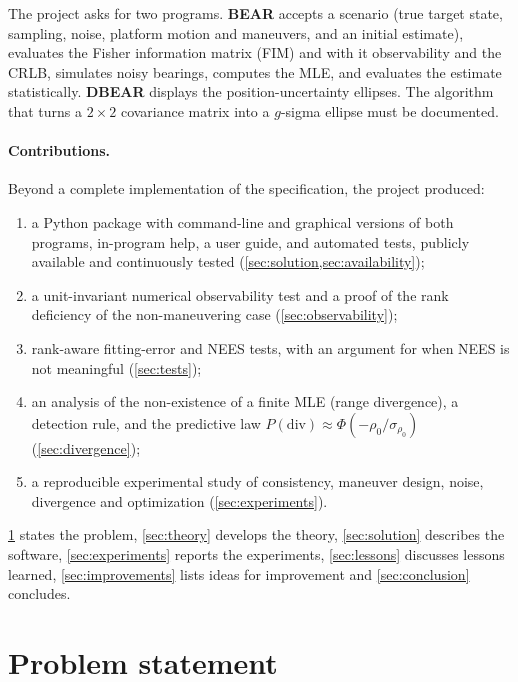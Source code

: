 \documentclass[11pt,a4paper]{article}
\theoremstyle{plain}
\theoremstyle{remark}
\begin{document}
The project asks for two programs. \textbf{BEAR} accepts a scenario (true
target state, sampling, noise, platform motion and maneuvers, and an initial
estimate), evaluates the Fisher information matrix (FIM) and with it
observability and the CRLB, simulates noisy bearings, computes the MLE, and
evaluates the estimate statistically. \textbf{DBEAR} displays the
position-uncertainty ellipses. The algorithm that turns a $2\times2$
covariance matrix into a $g$-sigma ellipse must be documented.

\paragraph{Contributions.} Beyond a complete implementation of the
specification, the project produced:
\begin{enumerate}[nosep]
  \item a Python package with command-line and graphical versions of both
        programs, in-program help, a user guide, and \testsTotal{} automated
        tests, publicly available and continuously tested
        (\cref{sec:solution,sec:availability});
  \item a unit-invariant numerical observability test and a proof of the
        rank deficiency of the non-maneuvering case (\cref{sec:observability});
  \item rank-aware fitting-error and NEES tests, with an argument for when
        NEES is not meaningful (\cref{sec:tests});
  \item an analysis of the non-existence of a finite MLE (range divergence),
        a detection rule, and the predictive law
        $P(\text{div})\approx\Phi(-\rho_0/\sigma_{\rho_0})$
        (\cref{sec:divergence});
  \item a reproducible experimental study of consistency, maneuver design,
        noise, divergence and optimization (\cref{sec:experiments}).
\end{enumerate}

\cref{sec:problem} states the problem, \cref{sec:theory} develops the
theory, \cref{sec:solution} describes the software, \cref{sec:experiments}
reports the experiments, \cref{sec:lessons} discusses lessons learned,
\cref{sec:improvements} lists ideas for improvement and \cref{sec:conclusion}
concludes.

\section{Problem statement}
\label{sec:problem}
\end{document}
